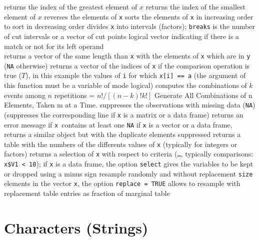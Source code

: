 	{ returns the index of the greatest element of $x$}
	{ returns the index of the smallest element of $x$}
	{ reverses the elements of {\tt x}}
	{sorts the elements of {\tt x} in increasing order}
	{to sort in decreasing order}
	{divides {\tt x} into intervals (factors); {\tt breaks} is the number of cut intervals or a vector of cut points}
	{logical vector indicating if there is a match or not for its left operand\\}
	{returns a vector of the same length than {\tt x}
    with the elements of {\tt x} which are in {\tt y} ({\tt NA}
    otherwise)}
	{returns a vector of the indices of {\tt x} if the
comparison operation is true ($T$), in this example the values of {\tt i} for
which {\tt x[i] == a} (the argument of this function must be a variable of mode
logical)}
	{ computes the combinations of $k$ events among $n$ repetitions = $n!/[(n-k)!k!]$}
	{ Generate All Combinations of n Elements, Taken m at a Time.}
	{suppresses the observations with missing data ({\tt NA}) (suppresses the corresponding line if {\tt x} is a matrix or a data frame)}
	{returns an error message if {\tt x }contains at least one {\tt NA}}
	{if {\tt x} is a vector or a data frame, returns a similar object but with the duplicate elements suppressed}
	{returns a table with the numbers of the differents values of {\tt x} (typically for integers or factors)}
	{returns a selection of {\tt x} with respect to criteria ({\tt \ldots}, typically comparisons: {\tt x\$V1 < 10}); if {\tt x} is a data frame, the option {\tt select} gives the variables to be kept or dropped using a minus sign}
	{resample randomly and without replacement {\tt size}
elements in the vector {\tt x}, the option {\tt replace = TRUE} allows to
resample with replacement}
	{table entries as fraction of marginal table}

\section{Characters (Strings)}{}

